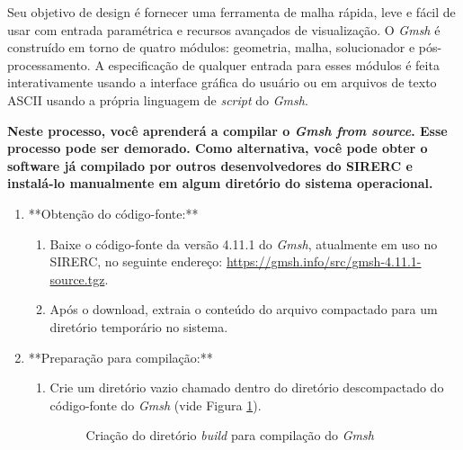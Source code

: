 \documentclass[a4paper,11pt]{article}
\newcommand{\sistema}{\textsf{SIRERC}}
\newcommand{\build}{\textit{build}}
\newcommand{\gmsh}{\textit{Gmsh}}
\newcommand{\cautionbox}[1]{
	\vskip 5mm
	\begin{leftbar}
		\textbf{#1}
	\end{leftbar}
	\vskip 5mm
}
\begin{document}
Seu objetivo de design é fornecer uma ferramenta de malha rápida, leve e fácil de usar com entrada paramétrica e recursos avançados de visualização. O \gmsh{} é construído em torno de quatro módulos: geometria, malha, solucionador e pós-processamento. A especificação de qualquer entrada para esses módulos é feita interativamente usando a interface gráfica do usuário ou em arquivos de texto ASCII usando a própria linguagem de \textit{script} do \gmsh{}.

\cautionbox{
	Neste processo, você aprenderá a compilar o \gmsh{} \emph{from source}. Esse processo pode ser demorado. Como alternativa, você pode obter o software já compilado por outros desenvolvedores do \sistema{} e instalá-lo manualmente em algum diretório do sistema operacional.
}

\begin{enumerate}
	\item **Obtenção do código-fonte:**
	\begin{enumerate}
		\item Baixe o código-fonte da versão 4.11.1 do \gmsh{}, atualmente em uso no \sistema{}, no seguinte endereço: \url{https://gmsh.info/src/gmsh-4.11.1-source.tgz}.
		\item Após o download, extraia o conteúdo do arquivo compactado para um diretório temporário no sistema.
	\end{enumerate}
	
	\item **Preparação para compilação:**
	\begin{enumerate}
		\item Crie um diretório vazio chamado  dentro do diretório descompactado do código-fonte do \gmsh{} (vide Figura \ref{fig:gmshbuilddir}).
		
		\begin{figure}[H]\centering
			\caption{Criação do diretório \build{} para compilação do \gmsh{}}\label{fig:gmshbuilddir}
		\end{figure}
		

\end{enumerate}
\end{enumerate}
\end{document}
